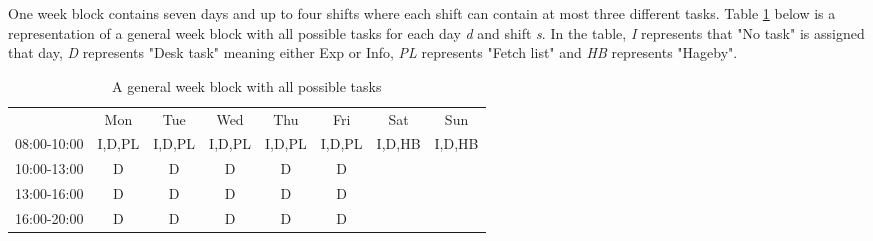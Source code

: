 One week block contains seven days and up to four shifts where each shift can contain at most three different tasks. Table \ref{Generalized week block} below is a representation of a general week block with all possible tasks for each day \textit{d} and shift \textit{s}. In the table, \textit{I} represents that "No task" is assigned that day, \textit{D} represents "Desk task" meaning either Exp or Info, \textit{PL} represents "Fetch list" and \textit{HB} represents "Hageby". 

\begin{table}[!h]
\centering
\caption{A general week block with all possible tasks}
\label{Generalized week block}
\begin{tabular}{cccccccc}
                         & Mon                         & Tue                         & Wed                         & Thu                         & Fri                         & Sat                         & Sun                         \\ \cline{2-8} 
\multicolumn{1}{c|}{08:00-10:00} & \multicolumn{1}{c|}{I,D,PL} & \multicolumn{1}{c|}{I,D,PL} & \multicolumn{1}{c|}{I,D,PL} & \multicolumn{1}{c|}{I,D,PL} & \multicolumn{1}{c|}{I,D,PL} & \multicolumn{1}{c|}{I,D,HB} & \multicolumn{1}{c|}{I,D,HB} \\ \cline{2-8} 
\multicolumn{1}{c|}{10:00-13:00} & \multicolumn{1}{c|}{D}      & \multicolumn{1}{c|}{D}      & \multicolumn{1}{c|}{D}      & \multicolumn{1}{c|}{D}      & \multicolumn{1}{c|}{D}      &       \\ \cline{2-6} 
\multicolumn{1}{c|}{13:00-16:00} & \multicolumn{1}{c|}{D}      & \multicolumn{1}{c|}{D}      & \multicolumn{1}{c|}{D}      & \multicolumn{1}{c|}{D}      & \multicolumn{1}{c|}{D}      &       \\ \cline{2-6} 
\multicolumn{1}{c|}{16:00-20:00} & \multicolumn{1}{c|}{D}      & \multicolumn{1}{c|}{D}      & \multicolumn{1}{c|}{D}      & \multicolumn{1}{c|}{D}      & \multicolumn{1}{c|}{D}      &       \\ \cline{2-6} 
\end{tabular}
\end{table}

